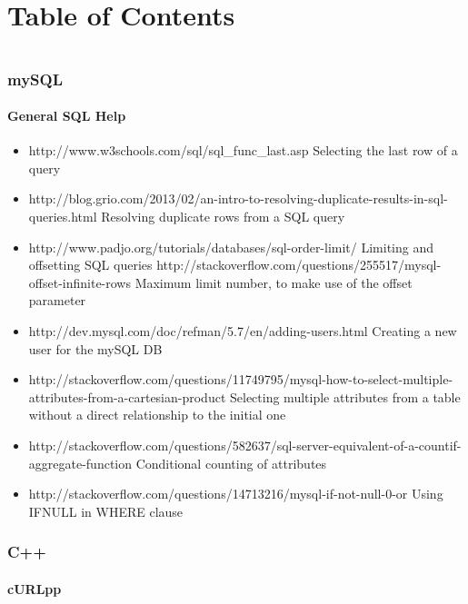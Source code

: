 \documentclass[12pt]{article}
\begin{document}
\part*{Table of Contents}
\tableofcontents
\pagebreak
\part*{}
\section{mySQL}
	\subsection{General SQL Help}
		\begin{itemize}
			\item http://www.w3schools.com/sql/sql\_func\_last.asp
			\subitem Selecting the last row of a query
			\item http://blog.grio.com/2013/02/an-intro-to-resolving-duplicate-results-in-sql-queries.html
			\subitem Resolving duplicate rows from a SQL query
			\item http://www.padjo.org/tutorials/databases/sql-order-limit/
			\subitem Limiting and offsetting SQL queries
			\subitem http://stackoverflow.com/questions/255517/mysql-offset-infinite-rows
			\subsubitem Maximum limit number, to make use of the offset parameter
			\item http://dev.mysql.com/doc/refman/5.7/en/adding-users.html
			\subitem Creating a new user for the mySQL DB
			\item http://stackoverflow.com/questions/11749795/mysql-how-to-select-multiple-attributes-from-a-cartesian-product
			\subitem Selecting multiple attributes from a table without a direct relationship to the initial one
			\item http://stackoverflow.com/questions/582637/sql-server-equivalent-of-a-countif-aggregate-function
			\subitem Conditional counting of attributes
			\item http://stackoverflow.com/questions/14713216/mysql-if-not-null-0-or
			\subitem Using IFNULL in WHERE clause
		\end{itemize}
\section{C++}
	\subsection{cURLpp}
\end{document}
